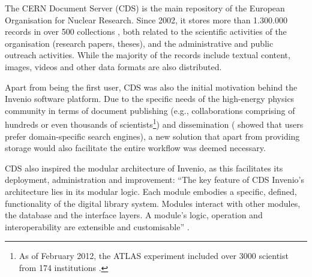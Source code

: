 
The CERN Document Server (CDS) is the main repository of the European
Organisation for Nuclear Research. Since 2002, it stores more than 1.300.000
records \cite{ref:cds} in over 500 collections \cite{ref:ludmilathesis}, both
related to the scientific activities of the organisation (research papers,
theses), and the administrative and public outreach activities. While the
majority of the records include textual content, images, videos and other data
formats are also distributed.

Apart from being the first user, CDS was also the initial motivation behind the
Invenio software platform. Due to the specific needs of the high-energy physics
community in terms of document publishing (e.g., collaborations comprising of
hundreds or even thousands of scientists\footnote{As of February 2012, the
ATLAS experiment included over 3000 scientist from 174 institutions
\cite{ref:atlas}.}) and dissemination (\cite{ref:annette} showed that users
prefer domain-specific search engines), a new solution that apart from
providing storage would also facilitate the entire workflow was deemed
necessary.

CDS also inspired the modular architecture of Invenio, as this facilitates its
deployment, administration and improvement: ``The key feature of CDS Invenio's
architecture lies in its modular logic. Each module embodies a specific,
defined, functionality of the digital library system. Modules interact with
other modules, the database and the interface layers. A module's logic,
operation and interoperability are extensible and customisable''
\cite{ref:lemeur}.
